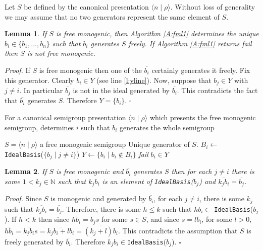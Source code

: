 \documentclass{acmconf}
\newtheorem{lemma}{Lemma}
\begin{document}
Let $S$ be defined by the canonical presentation 
$\langle n \mid \rho \rangle$. Without
loss of generality we may assume  that  no two generators
represent the same element of $S$.

\begin{lemma}
If $S$ is free monogenic, then Algorithm \ref{A:fml1} determines
the unique $b_i\in\{b_1, ..., b_n\}$ such that $\overline{b_i}$ generates 
$S$ freely. If Algorithm \ref{A:fml1} returns \emph{fail} then
$S$ is not free monogenic.
\end{lemma}
\emph{Proof.} If $S$ is free monogenic then
one of the $\overline{b_i}$ certainly generates it freely. Fix this generator.
Clearly $b_i\in Y$ (see line \ref{l:yline}). Now, suppose that $b_j\in Y$
with $j\neq i$. In particular $\overline{b_j}$ is not in the ideal generated
by $\overline{b_i}$. This contradicts the fact that $\overline{b_i}$ generates
$S$. Therefore $Y=\{b_i\}$. $\square$


\begin{algorithm}
\caption{For a canonical semigroup presentation $\langle n \mid \rho \rangle$ 
which presents the free monogenic semigroup, determines $i$ such that
$\overline{b_i}$ generates the whole semigroup}
\label{A:fml1}
\begin{algorithmic}[1]
\REQUIRE $S = \langle n \mid \rho \rangle$  a free monogenic semigroup
\ENSURE Unique generator of $S$.
        \STATE $B_i\leftarrow$ {\tt IdealBasis}($\{b_j \mid j \neq i\}$)
\ENDFOR
\STATE $Y\leftarrow \{b_i\mid b_i\notin B_i\}$ \label{l:yline}
 \emph{fail}
\ELSE 
{} $b_i\in Y$
\ENDIF
\end{algorithmic}
\end{algorithm}

\begin{lemma}\label{l:freegen}
If $S$ is free monogenic and $\overline{b_i}$ generates $S$ then for each
$j \neq i$ there is some $1 < k_j \in \mathbb{N}$
such that $k_j b_i$ is  an element of {\tt IdealBasis}($b_j$)
and $\overline{k_jb_i} = \overline{b_j}$.
\end{lemma}
\emph{Proof.} Since $S$ is monogenic and generated by $\overline{b_i}$, for
each
$j \neq i$, there is some $k_j$ such 
that $\overline{k_j b_i} = \overline{b_j}$. Therefore, there is some
$h \leq k$ such that $h b_i \in $ {\tt IdealBasis}($b_j$). 
If $h < k$ then since $\overline{hb_i}  = \overline{b_j} s$ 
for some $s \in S$, and since $s = \overline{lb_i}$, for some $l>0$,
$\overline{hb_i} = \overline{k_jb_i}s = \overline{k_jb_i + lb_i}
= \overline{(k_j + l)b_i}$. This contradicts the assumption that $S$ is  
freely generated by $\overline{b_i}$. 
Therefore $k_jb_i \in ${\tt IdealBasis}($b_j$). $\square$
\end{document}
